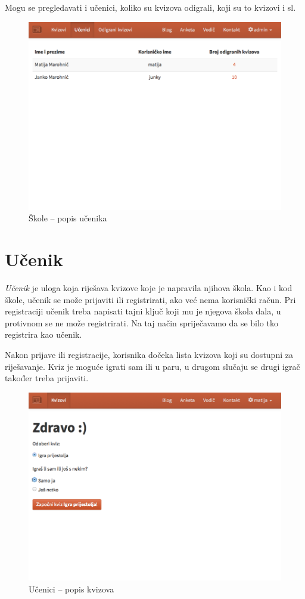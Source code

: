 \documentclass{scrreprt}
\begin{document}
Mogu se pregledavati i učenici, koliko su kvizova odigrali, koji su to kvizovi i
sl.

\begin{figure}[H]
  \includegraphics[width=\textwidth, clip=true, trim=0 15cm 0 0, fbox]{school/students}
  \caption{Škole -- popis učenika}
\end{figure}

\section{Učenik}

\emph{Učenik} je uloga koja riješava kvizove koje je napravila njihova škola.
Kao i kod škole, učenik se može prijaviti ili registrirati, ako već nema
korisnički račun. Pri registraciji učenik treba napisati tajni ključ koji mu je
njegova škola dala, u protivnom se ne može registrirati. Na taj način
spriječavamo da se bilo tko registrira kao učenik.

Nakon prijave ili registracije, korisnika dočeka lista kvizova koji su dostupni
za riješavanje. Kviz je moguće igrati sam ili u paru, u drugom slučaju se drugi
igrač također treba prijaviti.

\begin{figure}[H]
  \includegraphics[width=\textwidth, clip=true, trim=0 8.5cm 0 0, fbox]{student/quizzes}
  \caption{Učenici -- popis kvizova}
\end{figure}
\end{document}

